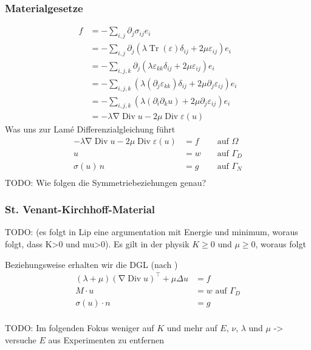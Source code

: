 \documentclass{scrartcl}
\def\e{\varepsilon}
\DeclareMathOperator{\grad}{\nabla}         %
\DeclareMathOperator{\Tr}{Tr}       	  %
\DeclareMathOperator{\diver}{Div}			%
\begin{document}
\subsubsection*{Materialgesetze}
\begin{align*}
	f
	&= -\sum_{i,j}\partial_j\sigma_{ij}e_i \\
	&= -\sum_{i,j}\partial_j\left(\lambda\Tr(\e)\delta_{ij}+2\mu\e_{ij}\right)e_i \\
	&= -\sum_{i,j,k}\partial_j\left(\lambda\e_{kk}\delta_{ij}+2\mu\e_{ij}\right)e_i \\
	&= -\sum_{i,j,k}\left(\lambda(\partial_j\e_{kk})\delta_{ij}+2\mu\partial_j\e_{ij}\right)e_i \\
	&= -\sum_{i,j,k}\left(\lambda(\partial_i\partial_ku)+2\mu\partial_j\e_{ij}\right)e_i \\
	&= -\lambda\grad\diver u-2\mu \diver\e(u)
\end{align*}
Was uns zur Lamé Differenzialgleichung führt
\begin{align*}
	-\lambda\grad\diver u-2\mu\diver\e(u) &= f &&\text{ auf }\Omega \\
	u&= w &&\text{ auf }\Gamma_D \\
	\sigma(u)\, n &= g &&\text{ auf }\Gamma_N \\
\end{align*}
TODO: Wie folgen die Symmetriebeziehungen genau?

\subsubsection*{St. Venant-Kirchhoff-Material}


TODO: (es folgt in Lip eine argumentation mit Energie und minimum, woraus folgt, dass K>0 und mu>0).
Es gilt in der physik $K\geq0$ und $\mu\geq0$, woraus folgt


Beziehungsweise erhalten wir die DGL (nach \cite{Alb-2002})
\begin{align*}
	(\lambda+\mu)(\grad\diver u)^\top + \mu\Delta u &= f \\
	M\cdot u&= w \text{ auf }\Gamma_D\\
	\sigma(u)\cdot n &= g \\
\end{align*}


TODO: Im folgenden Fokus weniger auf $K$ und mehr auf $E$, $\nu$, $\lambda$ und $\mu$ -> versuche $E$ aus Experimenten zu entfernen
\end{document}
